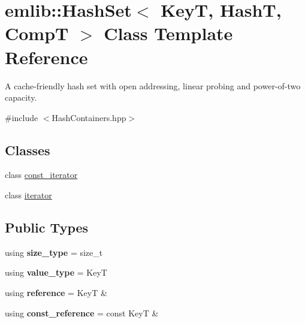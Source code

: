 \hypertarget{classemlib_1_1_hash_set}{\section{emlib\+:\+:Hash\+Set$<$ Key\+T, Hash\+T, Comp\+T $>$ Class Template Reference}
\label{classemlib_1_1_hash_set}
}


A cache-\/friendly hash set with open addressing, linear probing and power-\/of-\/two capacity.  




{\ttfamily \#include $<$Hash\+Containers.\+hpp$>$}

\subsection*{Classes}
\begin{DoxyCompactItemize}
\item 
class \hyperlink{classemlib_1_1_hash_set_1_1const__iterator}{const\+\_\+iterator}
\item 
class \hyperlink{classemlib_1_1_hash_set_1_1iterator}{iterator}
\end{DoxyCompactItemize}
\subsection*{Public Types}
\begin{DoxyCompactItemize}
\item 
\hypertarget{classemlib_1_1_hash_set_a9d2bfbc3ccb88135731b0c2e8811e17c}{using {\bfseries size\+\_\+type} = size\+\_\+t}\label{classemlib_1_1_hash_set_a9d2bfbc3ccb88135731b0c2e8811e17c}

\item 
\hypertarget{classemlib_1_1_hash_set_a9f885d86029a059a481b7583c6852321}{using {\bfseries value\+\_\+type} = Key\+T}\label{classemlib_1_1_hash_set_a9f885d86029a059a481b7583c6852321}

\item 
\hypertarget{classemlib_1_1_hash_set_a6c32f673a8031da047911b77c74529b7}{using {\bfseries reference} = Key\+T \&}\label{classemlib_1_1_hash_set_a6c32f673a8031da047911b77c74529b7}

\item 
\hypertarget{classemlib_1_1_hash_set_a90c39184c964a0dcf1e196a89f3698a2}{using {\bfseries const\+\_\+reference} = const Key\+T \&}\label{classemlib_1_1_hash_set_a90c39184c964a0dcf1e196a89f3698a2}

\end{DoxyCompactItemize}
